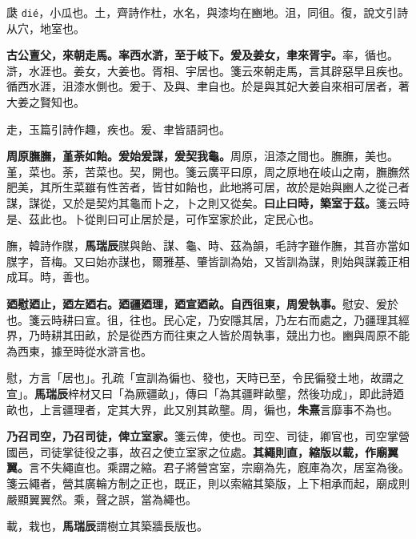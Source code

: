 \begin{quoting}瓞 \texttt{dié}，小瓜也。土，齊詩作杜，水名，與漆均在豳地。沮，同徂。復，說文引詩从穴，地室也。\end{quoting}

\textbf{古公亶父，來朝走馬。率西水滸，至于岐下。爰及姜女，聿來胥宇。}{\footnotesize 率，循也。滸，水涯也。姜女，大姜也。胥相、宇居也。箋云來朝走馬，言其辟惡早且疾也。循西水涯，沮漆水側也。爰于、及與、聿自也。於是與其妃大姜自來相可居者，著大姜之賢知也。}

\begin{quoting}走，玉篇引詩作趣，疾也。爰、聿皆語詞也。\end{quoting}

\textbf{周原膴膴，堇荼如飴。爰始爰謀，爰契我龜。}{\footnotesize 周原，沮漆之間也。膴膴，美也。堇，菜也。荼，苦菜也。契，開也。箋云廣平曰原，周之原地在岐山之南，膴膴然肥美，其所生菜雖有性苦者，皆甘如飴也，此地將可居，故於是始與豳人之從己者謀，謀從，又於是契灼其龜而卜之，卜之則又從矣。}\textbf{曰止曰時，築室于茲。}{\footnotesize 箋云時是、茲此也。卜從則曰可止居於是，可作室家於此，定民心也。}

\begin{quoting}膴，韓詩作腜，\textbf{馬瑞辰}腜與飴、謀、龜、時、茲為韻，毛詩字雖作膴，其音亦當如腜字，音梅。又曰始亦謀也，爾雅基、肇皆訓為始，又皆訓為謀，則始與謀義正相成耳。時，善也。\end{quoting}

\textbf{廼慰廼止，廼左廼右。廼疆廼理，廼宣廼畝。自西徂東，周爰執事。}{\footnotesize 慰安、爰於也。箋云時耕曰宣。徂，往也。民心定，乃安隱其居，乃左右而處之，乃疆理其經界，乃時耕其田畝，於是從西方而往東之人皆於周執事，競出力也。豳與周原不能為西東，據至時從水滸言也。}

\begin{quoting}慰，方言「居也」。孔疏「宣訓為徧也、發也，天時已至，令民徧發土地，故謂之宣」。\textbf{馬瑞辰}梓材又曰「為厥疆畝」，傳曰「為其疆畔畝壟，然後功成」，即此詩廼畝也，上言疆理者，定其大界，此又別其畝壟。周，徧也，\textbf{朱熹}言靡事不為也。\end{quoting}

\textbf{乃召司空，乃召司徒，俾立室家。}{\footnotesize 箋云俾，使也。司空、司徒，卿官也，司空掌營國邑，司徒掌徒役之事，故召之使立室家之位處。}\textbf{其繩則直，縮版以載，作廟翼翼。}{\footnotesize 言不失繩直也。乘謂之縮。君子將營宮室，宗廟為先，廐庫為次，居室為後。箋云繩者，營其廣輪方制之正也，既正，則以索縮其築版，上下相承而起，廟成則嚴顯翼翼然。乘，聲之誤，當為繩也。}

\begin{quoting}載，栽也，\textbf{馬瑞辰}謂樹立其築牆長版也。\end{quoting}

